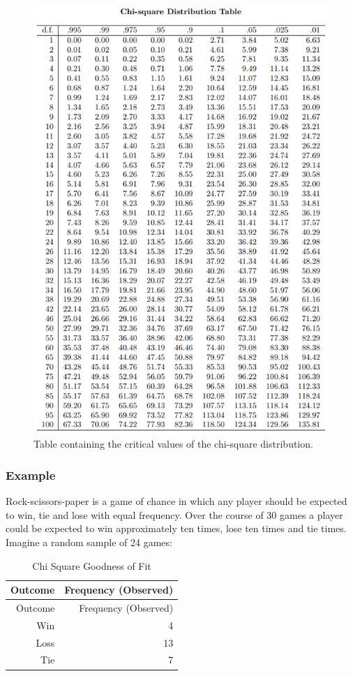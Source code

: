 \documentclass[
]{book}
\begin{document}
\begin{figure}
\centering
\includegraphics{chisquare.png}
\caption{Table containing the critical values of the chi-square distribution.}
\end{figure}

\hypertarget{example-14}{%
\subsubsection{Example}\label{example-14}}

Rock-scissors-paper is a game of chance in which any player should be expected to win, tie and lose with equal frequency. Over the course of 30 games a player could be expected to win approximately ten times, lose ten times and tie times. Imagine a random sample of 24 games:

\begin{longtable}[]{@{}rr@{}}
\caption{\label{tab:table011} Chi Square Goodness of Fit}\tabularnewline
\toprule
Outcome & Frequency (Observed) \\
\midrule
\endfirsthead
\toprule
Outcome & Frequency (Observed) \\
\midrule
\endhead
Win & 4 \\
Loss & 13 \\
Tie & 7 \\
\bottomrule
\end{longtable}
\end{document}
